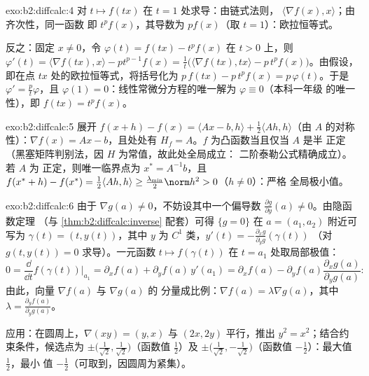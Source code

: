 \begin{solution}{exo:b2:diffcalc:4}
对 $t \mapsto f(tx)$ 在 $t = 1$ 处求导：由链式法则，
$\langle \nabla f(x), x\rangle$；由齐次性，同一函数
即 $t^pf(x)$，其导数为 $pf(x)$（取 $t = 1$）：欧拉恒等式。

反之：固定 $x \neq 0$，令 $\varphi(t) = f(tx) - t^p f(x)$
在 $t > 0$ 上，则 $\varphi'(t) = \langle\nabla f(tx), x\rangle -
pt^{p-1}f(x) = \frac1t\bigl(\langle \nabla f(tx), tx\rangle -
p\,t^pf(x)\bigr)$。由假设，即在点
$tx$ 处的欧拉恒等式，将括号化为 $p\,f(tx) - p\,t^pf(x) =
p\,\varphi(t)$。于是 $\varphi' = \frac{p}{t}\varphi$，且 $\varphi(1)
= 0$：线性常微分方程的唯一解为 $\varphi \equiv 0$（本科一年级
的唯一性），即 $f(tx) = t^pf(x)$。
\end{solution}

\begin{solution}{exo:b2:diffcalc:5}
展开 $f(x + h) - f(x) = \langle Ax - b, h\rangle +
\frac12\langle Ah, h\rangle$（由 $A$ 的对称性）：$\nabla f(x) = Ax -
b$，且处处有 $H_f = A$。$f$ 为凸函数当且仅当 $A$ 是半
正定（黑塞矩阵判别法，因 $H$ 为常值，故此处全局成立：
二阶泰勒公式精确成立）。若 $A$ 为
正定，则唯一临界点为 $x^* = A^{-1}b$，且 $f(x^*
+ h) - f(x^*) = \frac12\langle Ah, h\rangle \geq
\frac{\lambda_{\min}}{2}\norm h^2 > 0$（$h \neq 0$）：严格
全局极小值。
\end{solution}

\begin{solution}{exo:b2:diffcalc:6}
由于 $\nabla g(a) \neq 0$，不妨设其中一个偏导数 $\frac{\partial
g}{\partial y}(a) \neq 0$。由隐函数定理
（与 \cref{thm:b2:diffcalc:inverse} 配套）可得 $\{g =
0\}$ 在 $a = (a_1, a_2)$ 附近可写为 $\gamma(t) = (t, y(t))$，其中 $y$
为 $C^1$ 类，$y'(t) = -\frac{\partial_x g}{\partial_y g}(\gamma(t))$
（对 $g(t, y(t)) = 0$ 求导）。一元函数 $t
\mapsto f(\gamma(t))$ 在 $t = a_1$ 处取局部极值：
\[
0 = \frac{\dd}{\dd t}f(\gamma(t))\Big|_{a_1}
= \partial_x f(a) + \partial_y f(a)\,y'(a_1)
= \partial_x f(a) - \partial_yf(a)\frac{\partial_x
g(a)}{\partial_y g(a)} :
\]
由此，向量 $\nabla f(a)$ 与 $\nabla g(a)$ 的
分量成比例：$\nabla f(a) = \lambda \nabla g(a)$，其中 $\lambda =
\frac{\partial_y f(a)}{\partial_y g(a)}$。

应用：在圆周上，$\nabla(xy) = (y, x)$ 与
$(2x, 2y)$ 平行，推出 $y^2 = x^2$；结合约束条件，候选点为
$\pm\bigl(\tfrac{1}{\sqrt2}, \tfrac{1}{\sqrt2}\bigr)$（函数值
$\frac12$）及 $\pm\bigl(\tfrac{1}{\sqrt2},
-\tfrac{1}{\sqrt2}\bigr)$（函数值 $-\frac12$）：最大值 $\frac12$，最小
值 $-\frac12$（可取到，因圆周为紧集）。
\end{solution}

